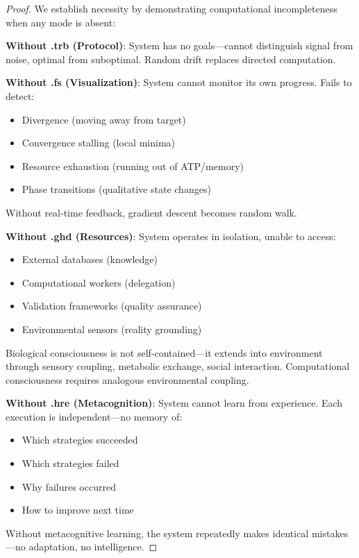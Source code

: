 \begin{proof}
We establish necessity by demonstrating computational incompleteness when any mode is absent:

\textbf{Without .trb (Protocol)}: System has no goals—cannot distinguish signal from noise, optimal from suboptimal. Random drift replaces directed computation.

\textbf{Without .fs (Visualization)}: System cannot monitor its own progress. Fails to detect:
\begin{itemize}
\item Divergence (moving away from target)
\item Convergence stalling (local minima)
\item Resource exhaustion (running out of ATP/memory)
\item Phase transitions (qualitative state changes)
\end{itemize}

Without real-time feedback, gradient descent becomes random walk.

\textbf{Without .ghd (Resources)}: System operates in isolation, unable to access:
\begin{itemize}
\item External databases (knowledge)
\item Computational workers (delegation)
\item Validation frameworks (quality assurance)
\item Environmental sensors (reality grounding)
\end{itemize}

Biological consciousness is not self-contained—it extends into environment through sensory coupling, metabolic exchange, social interaction. Computational consciousness requires analogous environmental coupling.

\textbf{Without .hre (Metacognition)}: System cannot learn from experience. Each execution is independent—no memory of:
\begin{itemize}
\item Which strategies succeeded
\item Which strategies failed
\item Why failures occurred
\item How to improve next time
\end{itemize}

Without metacognitive learning, the system repeatedly makes identical mistakes—no adaptation, no intelligence.


\end{proof}
